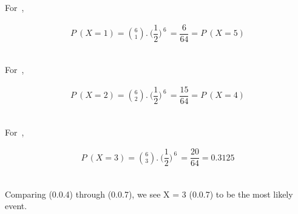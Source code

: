 \documentclass[journal,12pt,twocolumn]{IEEEtran}
\begin{document}
\begin{flushleft}For\ ,\end{flushleft}
\begin{align}P\ (X = 1) = \binom{6}{1}.\ \Big(\dfrac{1}{2}\Big)^{\ 6\ } = \dfrac{6}{64} = P\ (X = 5)\end{align}\\

\begin{flushleft}For\ ,\end{flushleft}
\begin{align}P\ (X = 2) = \binom{6}{2}.\ \Big(\dfrac{1}{2}\Big)^{\ 6\ } = \dfrac{15}{64} = P\ (X = 4)\end{align}\\

\begin{flushleft}For\ ,\end{flushleft}
\begin{align}P\ (X = 3) = \binom{6}{3}.\ \Big(\dfrac{1}{2}\Big)^{\ 6\ } = \dfrac{20}{64} = 0.3125\end{align}
\\
\begin{flushleft}Comparing (0.0.4) through (0.0.7), we see X = 3 (0.0.7) to be the most likely event.\end{flushleft}
\end{document}
